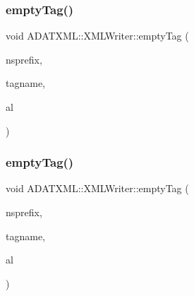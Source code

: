 \mbox{\label{classADATXML_1_1XMLWriter_a7b356346477d6f2e8e2d2db7553147dc}} 
\subsubsection{\texorpdfstring{emptyTag()}{emptyTag()}\hspace{0.1cm}{\footnotesize\ttfamily [7/8]}}
{\footnotesize\ttfamily void A\+D\+A\+T\+X\+M\+L\+::\+X\+M\+L\+Writer\+::empty\+Tag (\begin{DoxyParamCaption}\item[{const std\+::string \&}]{nsprefix,  }\item[{const std\+::string \&}]{tagname,  }\item[{\mbox{\hyperlink{namespaceXMLWriterAPI_a28cf3d8051a4ccf0aef208b7ebc66d07}{X\+M\+L\+Writer\+A\+P\+I\+::\+Attribute\+List}} \&}]{al }\end{DoxyParamCaption})}

\mbox{\label{classADATXML_1_1XMLWriter_a7b356346477d6f2e8e2d2db7553147dc}} 
\subsubsection{\texorpdfstring{emptyTag()}{emptyTag()}\hspace{0.1cm}{\footnotesize\ttfamily [8/8]}}
{\footnotesize\ttfamily void A\+D\+A\+T\+X\+M\+L\+::\+X\+M\+L\+Writer\+::empty\+Tag (\begin{DoxyParamCaption}\item[{const std\+::string \&}]{nsprefix,  }\item[{const std\+::string \&}]{tagname,  }\item[{\mbox{\hyperlink{namespaceXMLWriterAPI_a28cf3d8051a4ccf0aef208b7ebc66d07}{X\+M\+L\+Writer\+A\+P\+I\+::\+Attribute\+List}} \&}]{al }\end{DoxyParamCaption})}

\mbox{\label{classADATXML_1_1XMLWriter_a5599aaa358e07c8c7a4b7a137ec3e43a}} 
